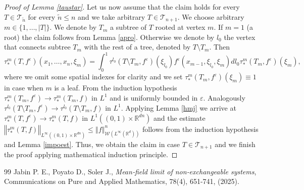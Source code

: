 \documentclass[10pt,a4paper]{amsart}
\newcommand{\R}{\mathbb{R}}
\newcommand{\Tree}{\mathcal{T}}
\newcommand{\W}{\mathcal{W}}
\newcommand{\izj}{\int_{0}^{1}}
\newcommand*{\norm}[1]{\left\Vert{#1}\right\Vert}
\newcommand{\ve}{\varepsilon}
\begin{document}
\begin{proof}[Proof of Lemma \ref{taustar}]
Let us now assume that the claim holds for every $T \in \Tree_{\tilde{n}}$ for every $\tilde{n} \leq n$ and we take arbitrary $T \in \Tree_{n+1}$. We choose arbitrary $m \in \{1,\dots,|T|\}$. We denote by $T_m$ a subtree of $T$ rooted at vertex $m$.  If $m=1$ (a root) the claim follows from Lemma \ref{apro}. Otherwise we denote by $l_0$ the vertex that connects subtree $T_m$ with the rest of a tree, denoted by $T\setminus T_m$. Then
\[
\tau^m_{*}(T,f^{\ve})(x_1,\dots,x_{n},\xi_m) = \izj \tau^{l_0}(T \setminus T_m,f^\ve)(\xi_{l_0})f^{\ve}(x_{m-1},\xi_{l_0},\xi_m)dl_0 \tau_{*}^m(T_m,f^\ve)(\xi_m),
\]
where we omit some spatial indexes for clarity and we set $\tau_{*}^m(T_m,f^\ve)(\xi_m) \equiv 1$ in case when $m$ is a leaf. From the induction hypothesis $\tau_{*}^m(T_m,f^\ve) \rightarrow \tau_{*}^m(T_m,f)$ in $L^{1}$ and is uniformly bounded in $\ve$. Analogously $\tau^{l_0}(T \setminus T_m,f^\ve)\rightarrow \tau^{l_0}(T \setminus T_m,f)$ in $L^{1}$. Applying Lemma \ref{hmj} we arrive at $\tau^m_{*}(T,f^{\ve}) \rightarrow \tau^m_{*}(T,f)$ in $L^1((0,1)\times \R^{dn})$ and the estimate $\norm{\tau^m_{*}(T,f)}_{L^{\infty}((0,1)\times \R^{dn})} \leq \norm{f}^n_{\W(L^{\infty}(\R^d))}$ follows from the induction hypothesis and Lemma \ref{impoest}. Thus, we obtain the claim in case $T \in \Tree_{n+1}$ and we finish the proof applying mathematical induction principle. 
\end{proof}

\begin{thebibliography}{99}
 Jabin P. E., Poyato D., Soler J., \textit{ Mean‐field limit of non‐exchangeable systems}, Communications on Pure and Applied Mathematics, 78(4), 651-741, (2025). %
\end{thebibliography}
\end{document}
